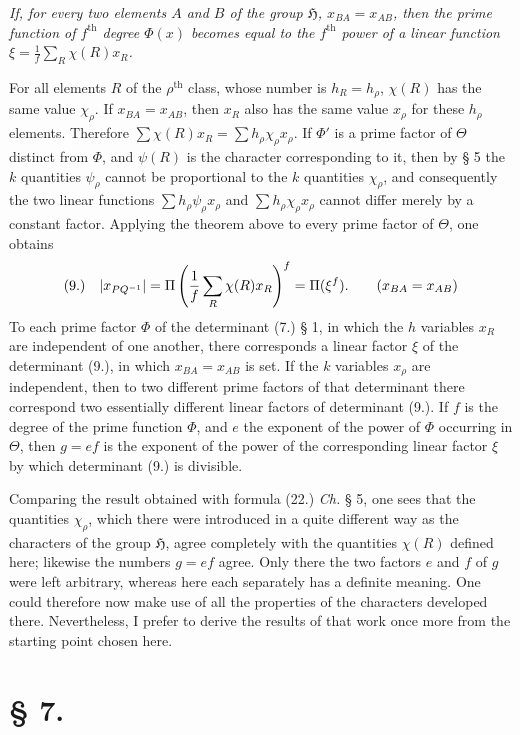 \documentclass[11pt]{article}
\makeatletter
\newcommand{\Hgrp}{\mathfrak{H}}
\newcommand{\frobtagc}[2]{\[\begin{array}{@{}r@{\quad}c@{}}\textup{(#1)} & \displaystyle #2\end{array}\]}
\makeatother
\begin{document}
\emph{If, for every two elements $A$ and $B$ of the group $\Hgrp$, $x_{BA}=x_{AB}$, then the prime function of $f^{\mathrm{th}}$ degree $\Phi(x)$ becomes equal to the $f^{\mathrm{th}}$ power of a linear function $\xi=\frac{1}{f}\sum_R\chi(R)x_R$.}

For all elements $R$ of the $\rho^{\mathrm{th}}$ class, whose number is $h_R=h_\rho$, $\chi(R)$ has the same value $\chi_\rho$. If $x_{BA}=x_{AB}$, then $x_R$ also has the same value $x_\rho$ for these $h_\rho$ elements. Therefore $\sum\chi(R)x_R=\sum h_\rho\chi_\rho x_\rho$. If $\Phi'$ is a prime factor of $\Theta$ distinct from $\Phi$, and $\psi(R)$ is the character corresponding to it, then by § 5 the $k$ quantities $\psi_\rho$ cannot be proportional to the $k$ quantities $\chi_\rho$, and consequently the two linear functions $\sum h_\rho\psi_\rho x_\rho$ and $\sum h_\rho\chi_\rho x_\rho$ cannot differ merely by a constant factor. Applying the theorem above to every prime factor of $\Theta$, one obtains
\frobtagc{9.}{|x_{PQ^{-1}}|=\Pi\left(\frac{1}{f}\sum_R\chi(R)x_R\right)^f=\Pi(\xi^f).\qquad(x_{BA}=x_{AB})}
To each prime factor $\Phi$ of the determinant (7.) § 1, in which the $h$ variables $x_R$ are independent of one another, there corresponds a linear factor $\xi$ of the determinant (9.), in which $x_{BA}=x_{AB}$ is set. If the $k$ variables $x_\rho$ are independent, then to two different prime factors of that determinant there correspond two essentially different linear factors of determinant (9.). If $f$ is the degree of the prime function $\Phi$, and $e$ the exponent of the power of $\Phi$ occurring in $\Theta$, then $g=ef$ is the exponent of the power of the corresponding linear factor $\xi$ by which determinant (9.) is divisible.

Comparing the result obtained with formula (22.) \emph{Ch.} § 5, one sees that the quantities $\chi_\rho$, which there were introduced in a quite different way as the characters of the group $\Hgrp$, agree completely with the quantities $\chi(R)$ defined here; likewise the numbers $g=ef$ agree. Only there the two factors $e$ and $f$ of $g$ were left arbitrary, whereas here each separately has a definite meaning. One could therefore now make use of all the properties of the characters developed there. Nevertheless, I prefer to derive the results of that work once more from the starting point chosen here.

\section*{§ 7.}
\end{document}
